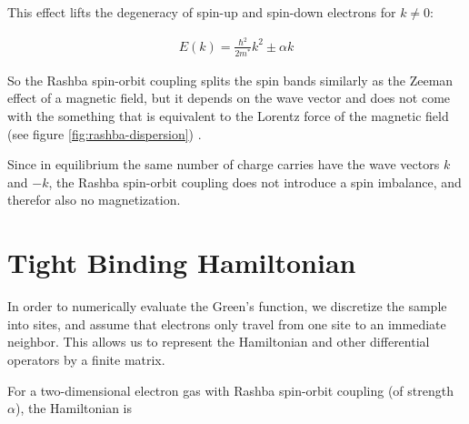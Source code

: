 \documentclass[11pt,twoside]{book}
\begin{document}
This effect lifts the degeneracy of spin-up and spin-down electrons for
$k \not= 0$:

\begin{align}
    E(k) = \frac{\hbar^2}{2 m^*} k^2 \pm \alpha k
\end{align}

So the Rashba spin-orbit coupling splits the spin bands similarly as the Zeeman
effect of a
magnetic field, but it depends on the wave vector and does not come with the
something that is equivalent to the Lorentz force of the magnetic field (see
figure \ref{fig:rashba-dispersion}) .

Since in equilibrium the same number of charge carries have the wave vectors
$k$ and $-k$, the Rashba spin-orbit coupling does not introduce a spin
imbalance, and therefor also no magnetization.


\section{Tight Binding Hamiltonian}
\label{sec:tight-binding}

In order to numerically evaluate the Green's function, we
discretize the sample into sites, and assume that electrons only travel from
one site to an immediate neighbor. This allows us to represent the
Hamiltonian and other differential operators by a finite matrix.


%
%

For a two-dimensional electron gas with Rashba spin-orbit coupling (of
strength $\alpha$), the Hamiltonian is
\end{document}

